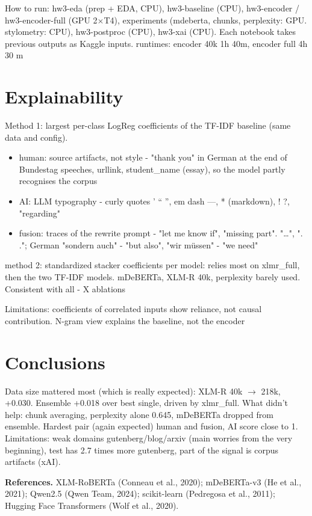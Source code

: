 \documentclass[10pt,a4paper]{article}
\begin{document}
\noindent How to run: hw3-eda (prep + EDA, CPU), hw3-baseline (CPU), hw3-encoder / hw3-encoder-full (GPU 2$\times$T4),
experiments (mdeberta, chunks, perplexity: GPU. stylometry: CPU), hw3-postproc (CPU), hw3-xai (CPU).
Each notebook takes previous outputs as Kaggle inputs. runtimes: encoder 40k 1h 40m, encoder full 4h 30 m

\section{Explainability}
Method 1: largest per-class LogReg coefficients of the TF-IDF baseline (same data and config).
\begin{itemize}
  \item human: source artifacts, not style - "thank you" in German at the end of Bundestag speeches, urllink, student\_name (essay), so the model partly recognises the corpus
  \item AI: LLM typography - curly quotes ’ “ ”, em dash —, * (markdown), ! ?, "regarding"
  \item fusion: traces of the rewrite prompt - "let me know if", "missing part". "\ldots", ". ."; German "sondern auch" - "but also", "wir müssen" - "we need"
\end{itemize}
method 2: standardized stacker coefficients per model: relies most on xlmr\_full, then the two TF-IDF models. 
mDeBERTa, XLM-R 40k, perplexity barely used. Consistent with all - X ablations

\noindent Limitations: coefficients of correlated inputs show reliance, not causal contribution. N-gram view explains the baseline, not the encoder

\section{Conclusions}
Data size mattered most (which is really expected): XLM-R 40k $\rightarrow$ 218k, +0.030. Ensemble +0.018 over best single, driven by xlmr\_full. What didn't help: chunk averaging, 
perplexity alone 0.645, mDeBERTa dropped from ensemble. Hardest pair (again expected) human and fusion, 
AI score close to 1. Limitations: weak domains gutenberg/blog/arxiv (main worries from the very beginning),
test has 2.7 times more gutenberg, part of the signal is corpus artifacts (xAI).

\noindent\textbf{References.} XLM-RoBERTa (Conneau et al., 2020); mDeBERTa-v3 (He et al., 2021); Qwen2.5 (Qwen Team, 2024); scikit-learn (Pedregosa et al., 2011); Hugging Face Transformers (Wolf et al., 2020).
\clearpage
\appendix
\end{document}
